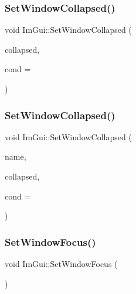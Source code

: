 \subsubsection{\texorpdfstring{Set\+Window\+Collapsed()}{SetWindowCollapsed()}\hspace{0.1cm}{\footnotesize\ttfamily [1/2]}}
{\footnotesize\ttfamily void Im\+Gui\+::\+Set\+Window\+Collapsed (\begin{DoxyParamCaption}\item[{bool}]{collapsed,  }\item[{\mbox{\hyperlink{imgui_8h_aef890d6ac872e12c5804d0b3e4f7f103}{Im\+Gui\+Cond}}}]{cond = {} }\end{DoxyParamCaption})}

\mbox{\label{namespace_im_gui_ac349187d6aae141cd3b4476e54bcc338}} 
\subsubsection{\texorpdfstring{Set\+Window\+Collapsed()}{SetWindowCollapsed()}\hspace{0.1cm}{\footnotesize\ttfamily [2/2]}}
{\footnotesize\ttfamily void Im\+Gui\+::\+Set\+Window\+Collapsed (\begin{DoxyParamCaption}\item[{const char $\ast$}]{name,  }\item[{bool}]{collapsed,  }\item[{\mbox{\hyperlink{imgui_8h_aef890d6ac872e12c5804d0b3e4f7f103}{Im\+Gui\+Cond}}}]{cond = {} }\end{DoxyParamCaption})}

\mbox{\label{namespace_im_gui_ac71920931ed7b7c8594ee84c6a94e7b8}} 
\subsubsection{\texorpdfstring{Set\+Window\+Focus()}{SetWindowFocus()}\hspace{0.1cm}{\footnotesize\ttfamily [1/2]}}
{\footnotesize\ttfamily void Im\+Gui\+::\+Set\+Window\+Focus (\begin{DoxyParamCaption}{ }\end{DoxyParamCaption})}


